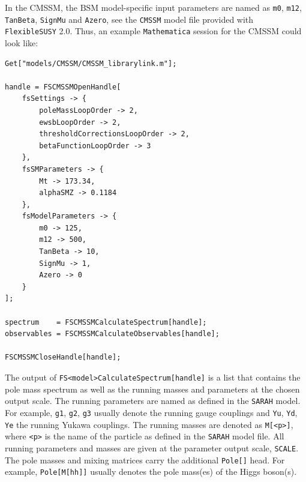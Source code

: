 \documentclass[final,3p,11pt,pdflatex]{elsarticle}
\makeatletter
\newcommand{\modelname}[1]{\texttt{#1}\@\xspace}
\newcommand{\sarah}{\texttt{SARAH}\@\xspace}
\newcommand{\fs}{\texttt{FlexibleSUSY}\@\xspace}
\newcommand{\fstwo}{\fs 2.0\@\xspace}
\newcommand{\mathematica}{\texttt{Ma\-the\-ma\-ti\-ca}\xspace}
\newcommand{\code}[1]{\lstinline|#1|}  %
\newcommand{\BSM}{\ensuremath{\text{BSM}}\xspace}
\makeatother
\begin{document}
%
\begin{example}
  In the CMSSM, the \BSM model-specific input parameters are named as
  \code{m0}, \code{m12}, \code{TanBeta}, \code{SignMu} and
  \code{Azero}, see the \modelname{CMSSM} model file provided with \fstwo.
  Thus, an example \mathematica session for the CMSSM could look like:
%
\begin{lstlisting}
Get["models/CMSSM/CMSSM_librarylink.m"];

handle = FSCMSSMOpenHandle[
    fsSettings -> {
        poleMassLoopOrder -> 2,
        ewsbLoopOrder -> 2,
        thresholdCorrectionsLoopOrder -> 2,
        betaFunctionLoopOrder -> 3
    },
    fsSMParameters -> {
        Mt -> 173.34,
        alphaSMZ -> 0.1184
    },
    fsModelParameters -> {
        m0 -> 125,
        m12 -> 500,
        TanBeta -> 10,
        SignMu -> 1,
        Azero -> 0
    }
];

spectrum    = FSCMSSMCalculateSpectrum[handle];
observables = FSCMSSMCalculateObservables[handle];

FSCMSSMCloseHandle[handle];
\end{lstlisting}
\end{example}
%
The output of \code{FS<model>CalculateSpectrum[handle]} is a list
that contains the pole mass spectrum as well as the running masses
and parameters at the chosen output scale.
%
The running parameters are named as defined in the \sarah model.  For
example, \code{g1}, \code{g2}, \code{g3} usually denote the running
gauge couplings and \code{Yu}, \code{Yd}, \code{Ye} the running Yukawa
couplings.  The running masses are denoted as \code{M[<p>]}, where
\code{<p>} is the name of the particle as defined in the \sarah model
file.  All running parameters and masses are given at the parameter
output scale, \code{SCALE}.  The pole masses and mixing matrices carry
the additional \code{Pole[]} head.  For example, \code{Pole[M[hh]]}
usually denotes the pole mass(es) of the Higgs boson(s).
\end{document}
